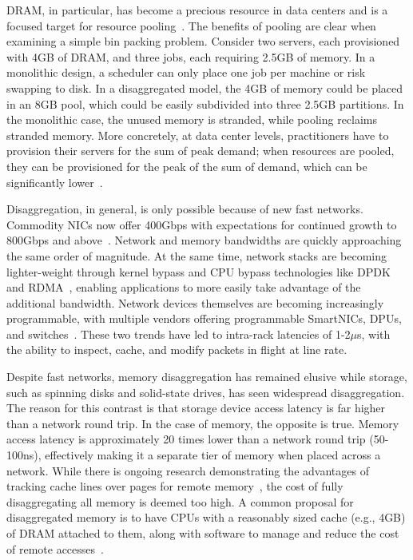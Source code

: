 \documentclass[12pt]{ucsddissertation}
\begin{document}
\begin{dissertationintroduction}
DRAM, in particular, has become a precious resource in data centers and is a focused target for
resource pooling~\cite{micron-memorywall}. The benefits of pooling are clear when examining a simple
bin packing problem. Consider two servers, each provisioned with 4GB of DRAM, and three jobs, each
requiring 2.5GB of memory. In a monolithic design, a scheduler can only place one job per machine or
risk swapping to disk. In a disaggregated model, the 4GB of memory could be placed in an 8GB pool,
which could be easily subdivided into three 2.5GB partitions. In the monolithic case, the unused
memory is stranded, while pooling reclaims stranded memory. More concretely, at data center levels,
practitioners have to provision their servers for the sum of peak demand; when resources are pooled,
they can be provisioned for the peak of the sum of demand, which can be significantly
lower~\cite{ dsnf, supernic}.

Disaggregation, in general, is only possible because of new fast networks. Commodity NICs now offer
400Gbps with expectations for continued growth to 800Gbps and above~\cite{cx8}. Network and memory
bandwidths are quickly approaching the same order of magnitude. At the same time, network stacks are
becoming lighter-weight through kernel bypass and CPU bypass technologies like DPDK~\cite{dpdk} and
RDMA~\cite{infiniband-spec}, enabling applications to more easily take advantage of the additional
bandwidth. Network devices themselves are becoming increasingly programmable, with multiple vendors
offering programmable SmartNICs, DPUs, and switches~\cite{tofino2,bluefield,pensando}. These two
trends have led to intra-rack latencies of 1-2{$\mu$}s, with the ability to inspect, cache, and
modify packets in flight at line rate.


Despite fast networks, memory disaggregation has remained elusive while storage, such as spinning
disks and solid-state drives, has seen widespread disaggregation. The reason for this contrast is
that storage device access latency is far higher than a network round trip. In the case of memory,
the opposite is true. Memory access latency is approximately 20 times lower than a network round
trip (50-100ns), effectively making it a separate tier of memory when placed across a network. While
there is ongoing research demonstrating the advantages of tracking cache lines over pages for remote
memory~\cite{kona}, the cost of fully disaggregating all memory is deemed too high. A common
proposal for disaggregated memory is to have CPUs with a reasonably sized cache (e.g., 4GB) of DRAM
attached to them, along with software to manage and reduce the cost of remote
accesses~\cite{legoos}.


\end{dissertationintroduction}
\end{document}

